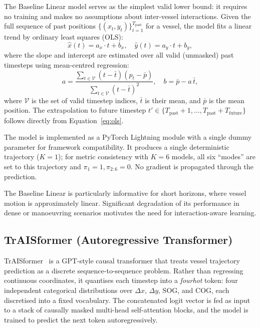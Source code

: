 \documentclass[12pt, a4paper]{article}
\begin{document}
The Baseline Linear model serves as the simplest valid lower bound: it
requires no training and makes no assumptions about inter-vessel
interactions.  Given the full sequence of past positions
$\{(x_t, y_t)\}_{t=1}^{T_{\text{past}}}$ for a vessel, the model fits
a linear trend by ordinary least squares (OLS):
\begin{equation}
  \hat{x}(t) = a_x \cdot t + b_x, \quad
  \hat{y}(t) = a_y \cdot t + b_y,
  \label{eq:ols}
\end{equation}
where the slope and intercept are estimated over all valid (unmasked) past
timesteps using mean-centred regression:
\begin{equation}
  a = \frac{\sum_{t \in \mathcal{V}} (t - \bar{t})(p_t - \bar{p})}
           {\sum_{t \in \mathcal{V}} (t - \bar{t})^2}, \quad
  b = \bar{p} - a\,\bar{t},
  \label{eq:ols_coeff}
\end{equation}
where $\mathcal{V}$ is the set of valid timestep indices, $\bar{t}$ is
their mean, and $\bar{p}$ is the mean position.  The extrapolation to
future timestep $t' \in \{T_{\text{past}}+1, \dots,
T_{\text{past}}+T_{\text{future}}\}$ follows directly from
Equation~\eqref{eq:ols}.

The model is implemented as a PyTorch Lightning module with a single
dummy parameter for framework compatibility.  It produces a single
deterministic trajectory ($K=1$); for metric consistency with
$K=6$ models, all six ``modes'' are set to this trajectory and
$\pi_1 = 1, \pi_{2:6} = 0$.  No gradient is propagated through the
prediction.

The Baseline Linear is particularly informative for short horizons, where
vessel motion is approximately linear.  Significant degradation of its
performance in dense or manoeuvring scenarios motivates the need for
interaction-aware learning.

\subsection{TrAISformer (Autoregressive Transformer)}
\label{sec:traisformer}

TrAISformer~\citep{nguyen2021traisformer} is a GPT-style causal
transformer that treats vessel trajectory prediction as a discrete
sequence-to-sequence problem.  Rather than regressing continuous
coordinates, it quantises each timestep into a \emph{fourhot} token:
four independent categorical distributions over $\Delta x$, $\Delta y$,
SOG, and COG, each discretised into a fixed vocabulary.  The
concatenated logit vector is fed as input to a stack of causally masked
multi-head self-attention blocks, and the model is trained to predict the
next token autoregressively.
\end{document}

